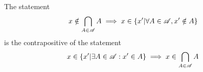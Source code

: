 \documentclass[main.tex]{subfiles}
\begin{document}
\subproblem{}\label{6f}

\begin{remark}
	The statement
	\[x \notin \bigcap\limits_{A \in \mathscr{A}} {A} \implies x \in \{x'|\forall A \in \mathscr{A}, x' \notin A\}\]
	is the contrapositive of the statement
	\[x \in \{x'|\exists A \in \mathscr{A} : x' \in A\} \implies x \in \bigcap\limits_{A \in \mathscr{A}} {A}\]
\end{remark}
\end{document}
